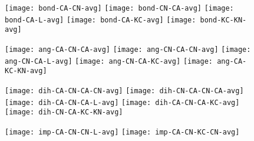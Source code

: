 \documentclass{article}
\begin{document}
\begin{figure}
  \begin{center}
    \begin{minipage}[t]{1.0\textwidth}
      \texttt{[image: bond-CA-CN-avg]}
      \texttt{[image: bond-CN-CA-avg]}
      \texttt{[image: bond-CA-L-avg]}
      \texttt{[image: bond-CA-KC-avg]}
      \texttt{[image: bond-KC-KN-avg]}
    \end{minipage}
  \end{center}
\end{figure}

\begin{figure}
  \begin{center}
    \begin{minipage}[t]{1.0\textwidth}
      \texttt{[image: ang-CA-CN-CA-avg]}
      \texttt{[image: ang-CN-CA-CN-avg]}
      \texttt{[image: ang-CN-CA-L-avg]}
      \texttt{[image: ang-CN-CA-KC-avg]}
      \texttt{[image: ang-CA-KC-KN-avg]}
    \end{minipage}
  \end{center}
\end{figure}

\begin{figure}
  \begin{center}
    \begin{minipage}[t]{1.0\textwidth}
      \texttt{[image: dih-CA-CN-CA-CN-avg]}
      \texttt{[image: dih-CN-CA-CN-CA-avg]}
      \texttt{[image: dih-CA-CN-CA-L-avg]}
      \texttt{[image: dih-CA-CN-CA-KC-avg]}
      \texttt{[image: dih-CN-CA-KC-KN-avg]}
    \end{minipage}
  \end{center}
\end{figure}

\begin{figure}
  \begin{center}
    \begin{minipage}[t]{1.0\textwidth}
      \texttt{[image: imp-CA-CN-CN-L-avg]}
      \texttt{[image: imp-CA-CN-KC-CN-avg]}
    \end{minipage}
  \end{center}
\end{figure}
\end{document}
